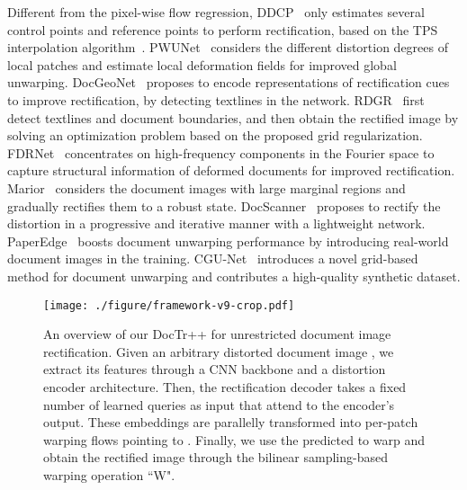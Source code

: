 \documentclass[lettersize,journal]{IEEEtran}
\begin{document}
Different from the pixel-wise flow regression, DDCP~\cite{xie2021document} only estimates several control points and reference points to perform rectification,
based on the TPS interpolation algorithm~\cite{meijering2002chronology}.
PWUNet~\cite{das2021end} considers the different distortion degrees of local patches and estimate local deformation fields for improved global unwarping.
DocGeoNet~\cite{feng2022geometric} proposes to encode representations of rectification cues to improve rectification, by detecting textlines in the network.
RDGR~\cite{jiang2022revisiting} first detect textlines and document boundaries, and then obtain the rectified image by solving an optimization problem based on the proposed grid regularization.
FDRNet~\cite{xue2022fourier} concentrates on high-frequency components in the Fourier space to capture structural information of deformed documents for improved rectification.
Marior~\cite{zhang2022marior} considers the document images with large marginal regions and gradually rectifies them to a robust state.
DocScanner~\cite{feng2021docscanner} proposes to rectify the distortion in a progressive and iterative manner with a lightweight network.
PaperEdge~\cite{ma2022learning} boosts document unwarping performance by introducing real-world document images in the training.
CGU-Net~\cite{verhoeven2023neural} introduces a novel grid-based method for document unwarping and contributes a high-quality synthetic dataset.

\begin{figure*}[t]
  \centering
  \texttt{[image: ./figure/framework-v9-crop.pdf]}
  \caption{An overview of our DocTr++ for unrestricted document image rectification. Given an arbitrary distorted document image , we extract its features through a CNN backbone and a distortion encoder architecture. 
  Then, the rectification decoder takes a fixed number of learned queries as input that attend to the encoder's output.
  These embeddings are parallelly transformed into per-patch warping flows  pointing to .
  Finally, we use the predicted  to warp  and obtain the rectified image  through the bilinear sampling-based warping operation ``W".
  }
  \label{fig:overview}
\end{figure*}
\end{document}
